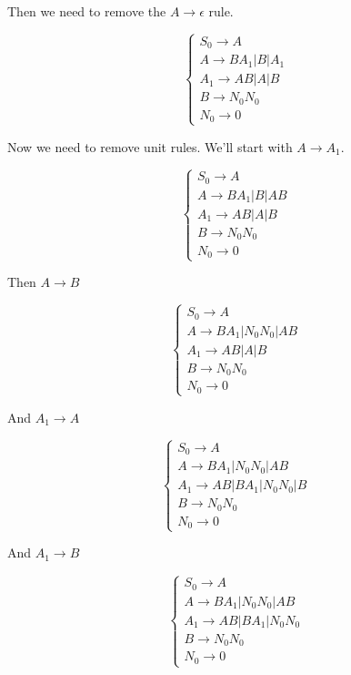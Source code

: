 \documentclass{article}
\begin{document}
Then we need to remove the $A\rightarrow\epsilon$ rule.

\[\begin{cases}
S_0\rightarrow A \\
A\rightarrow BA_1 | B | A_1 \\
A_1\rightarrow AB | A | B \\
B\rightarrow N_0 N_0  \\
N_0\rightarrow 0
\end{cases}\]

Now we need to remove unit rules. We'll start with
$A\rightarrow{}A_1$.

\[\begin{cases}
S_0\rightarrow A \\
A\rightarrow BA_1 | B | AB \\
A_1\rightarrow AB | A | B \\
B\rightarrow N_0 N_0  \\
N_0\rightarrow 0
\end{cases}\]

Then $A\rightarrow{}B$

\[\begin{cases}
S_0\rightarrow A \\
A\rightarrow BA_1 | N_0 N_0 | AB \\
A_1\rightarrow AB | A | B \\
B\rightarrow N_0 N_0  \\
N_0\rightarrow 0
\end{cases}\]

And $A_1\rightarrow{}A$

\[\begin{cases}
S_0\rightarrow A \\
A\rightarrow BA_1 | N_0 N_0 | AB \\
A_1\rightarrow AB | BA_1 | N_0 N_0 | B \\
B\rightarrow N_0 N_0  \\
N_0\rightarrow 0
\end{cases}\]

And $A_1\rightarrow{}B$

\[\begin{cases}
S_0\rightarrow A \\
A\rightarrow BA_1 | N_0 N_0 | AB \\
A_1\rightarrow AB | BA_1 | N_0 N_0 \\
B\rightarrow N_0 N_0  \\
N_0\rightarrow 0
\end{cases}\]
\end{document}
